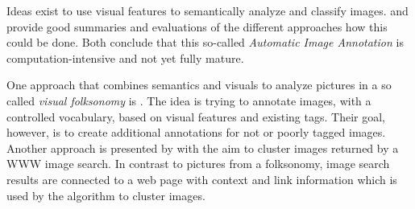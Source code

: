 Ideas exist to use visual features to semantically analyze and classify images. \cite{Liu2007} and \cite{Zhang2012} provide good summaries and evaluations of the different approaches how this could be done. Both conclude that this so-called \emph{Automatic Image Annotation}  is computation-intensive and not yet fully mature.

\bigskip
One approach that combines semantics and visuals to analyze pictures in a so called \emph{visual folksonomy} is \cite{Lindstaedt2009}. The idea is trying to annotate images, with a controlled vocabulary, based on visual features and existing tags. Their goal, however, is to create additional annotations for not or poorly tagged images. \\
Another approach is presented by \cite{cai2004hierarchical} with the aim to cluster images returned by a WWW image search. In contrast to pictures from a folksonomy, image search results are connected to a web page with context and link information which is used by the algorithm to cluster images.
